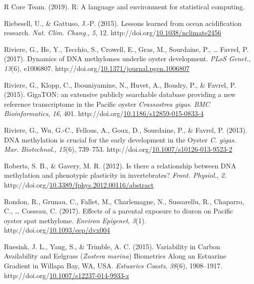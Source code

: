 \documentclass [11pt, proquest] {uwthesis}[2015/03/03]
\newlength{\cslhangindent}
\newenvironment{CSLReferences}%
{\setlength{\parindent}{0pt}%
\everypar{\setlength{\hangindent}{\cslhangindent}}\ignorespaces}%
{\par}
\begin{document}
\begin{CSLReferences}{1}{0}
\leavevmode\hypertarget{ref-R_Core_Team2019}{}%
R Core Team. (2019). {R: A language and environment for statistical computing}.

\leavevmode\hypertarget{ref-Riebesell2015}{}%
Riebesell, U., \& Gattuso, J.-P. (2015). {Lessons learned from ocean acidification research}. \emph{Nat. Clim. Chang.}, \emph{5}, 12. http://doi.org/\href{https://doi.org/10.1038/nclimate2456}{10.1038/nclimate2456}

\leavevmode\hypertarget{ref-Riviere2017}{}%
Riviere, G., He, Y., Tecchio, S., Crowell, E., Gras, M., Sourdaine, P., \ldots{} Favrel, P. (2017). {Dynamics of DNA methylomes underlie oyster development}. \emph{PLoS Genet.}, \emph{13}(6), e1006807. http://doi.org/\href{https://doi.org/10.1371/journal.pgen.1006807}{10.1371/journal.pgen.1006807}

\leavevmode\hypertarget{ref-Riviere2015}{}%
Riviere, G., Klopp, C., Ibouniyamine, N., Huvet, A., Boudry, P., \& Favrel, P. (2015). {GigaTON: an extensive publicly searchable database providing a new reference transcriptome in the Pacific oyster \emph{Crassostrea gigas}}. \emph{BMC Bioinformatics}, \emph{16}, 401. http://doi.org/\href{https://doi.org/10.1186/s12859-015-0833-4}{10.1186/s12859-015-0833-4}

\leavevmode\hypertarget{ref-Riviere2013}{}%
Riviere, G., Wu, G.-C., Fellous, A., Goux, D., Sourdaine, P., \& Favrel, P. (2013). {DNA methylation is crucial for the early development in the Oyster \emph{C. gigas}}. \emph{Mar. Biotechnol.}, \emph{15}(6), 739--753. http://doi.org/\href{https://doi.org/10.1007/s10126-013-9523-2}{10.1007/s10126-013-9523-2}

\leavevmode\hypertarget{ref-Roberts2012}{}%
Roberts, S. B., \& Gavery, M. R. (2012). {Is there a relationship between DNA methylation and phenotypic plasticity in invertebrates?} \emph{Front. Physiol.}, \emph{2}. http://doi.org/\href{https://doi.org/10.3389/fphys.2012.00116/abstract}{10.3389/fphys.2012.00116/abstract}

\leavevmode\hypertarget{ref-Rondon2017}{}%
Rondon, R., Grunau, C., Fallet, M., Charlemagne, N., Sussarellu, R., Chaparro, C., \ldots{} Cosseau, C. (2017). {Effects of a parental exposure to diuron on Pacific oyster spat methylome}. \emph{Environ Epigenet}, \emph{3}(1). http://doi.org/\href{https://doi.org/10.1093/eep/dvx004}{10.1093/eep/dvx004}

\leavevmode\hypertarget{ref-Ruesink2015}{}%
Ruesink, J. L., Yang, S., \& Trimble, A. C. (2015). {Variability in Carbon Availability and Eelgrass (\emph{Zostera marina}) Biometrics Along an Estuarine Gradient in Willapa Bay, WA, USA}. \emph{Estuaries Coasts}, \emph{38}(6), 1908--1917. http://doi.org/\href{https://doi.org/10.1007/s12237-014-9933-z}{10.1007/s12237-014-9933-z}


\end{CSLReferences}
\end{document}
